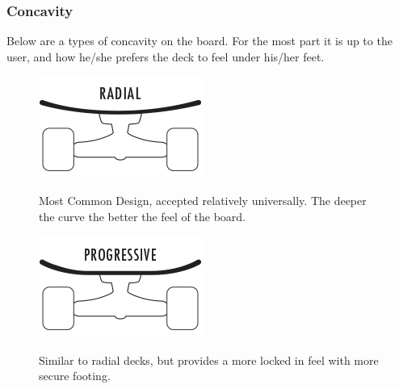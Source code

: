 \documentclass[letterpaper,12pt]{article}
\begin{document}
\subsubsection{Concavity}
Below are a types of concavity on the board. For the most part it is up to the user, and how he/she prefers the deck to feel under his/her feet. 

\begin{itemize}

\begin{figure}[!htbp]\centering

\begin{minipage}{.5\textwidth}\centering
\includegraphics[width=.8\textwidth]{radial.jpg}
\label{radial}
\end{minipage}
\item Most Common Design, accepted relatively universally. The deeper the curve the better the feel of the board. 
\end{figure}

\begin{figure}[!htbp]\centering
\begin{minipage}{.5\textwidth}\centering
\includegraphics[width=.8\textwidth]{progressive.jpg}
\label{progressive}
\end{minipage}
\item Similar to radial decks, but provides a more locked in feel with more secure footing.
\end{figure}


\end{itemize}
\end{document}
